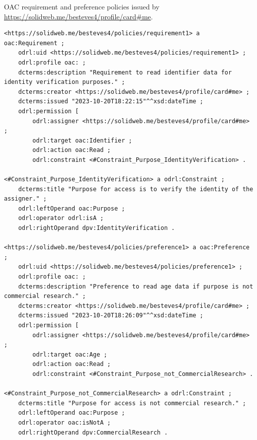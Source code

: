 \begin{listing}[htp]
\caption[OAC requirement and preference policies.]{OAC requirement and preference policies issued by \url{https://solidweb.me/besteves4/profile/card\#me}.}
\label{list:oac_req_pref}
\begin{verbatim}
<https://solidweb.me/besteves4/policies/requirement1> a oac:Requirement ;
    odrl:uid <https://solidweb.me/besteves4/policies/requirement1> ;
    odrl:profile oac: ;
    dcterms:description "Requirement to read identifier data for identity verification purposes." ;
    dcterms:creator <https://solidweb.me/besteves4/profile/card#me> ;
    dcterms:issued "2023-10-20T18:22:15"^^xsd:dateTime ;
    odrl:permission [
        odrl:assigner <https://solidweb.me/besteves4/profile/card#me> ;
        odrl:target oac:Identifier ;
        odrl:action oac:Read ;
        odrl:constraint <#Constraint_Purpose_IdentityVerification> .

<#Constraint_Purpose_IdentityVerification> a odrl:Constraint ;
    dcterms:title "Purpose for access is to verify the identity of the assigner." ;
    odrl:leftOperand oac:Purpose ;
    odrl:operator odrl:isA ;
    odrl:rightOperand dpv:IdentityVerification .

<https://solidweb.me/besteves4/policies/preference1> a oac:Preference ;
    odrl:uid <https://solidweb.me/besteves4/policies/preference1> ;
    odrl:profile oac: ;
    dcterms:description "Preference to read age data if purpose is not commercial research." ;
    dcterms:creator <https://solidweb.me/besteves4/profile/card#me> ;
    dcterms:issued "2023-10-20T18:26:09"^^xsd:dateTime ;
    odrl:permission [
        odrl:assigner <https://solidweb.me/besteves4/profile/card#me> ;
        odrl:target oac:Age ;
        odrl:action oac:Read ;
        odrl:constraint <#Constraint_Purpose_not_CommercialResearch> .

<#Constraint_Purpose_not_CommercialResearch> a odrl:Constraint ;
    dcterms:title "Purpose for access is not commercial research." ;
    odrl:leftOperand oac:Purpose ;
    odrl:operator oac:isNotA ;
    odrl:rightOperand dpv:CommercialResearch .
\end{verbatim}
\end{listing}

